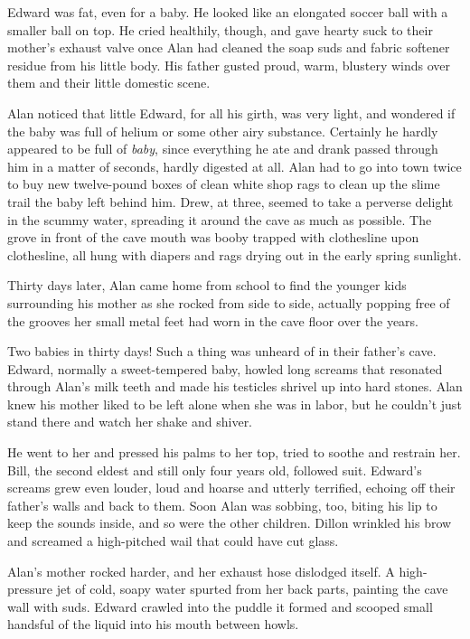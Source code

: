 Edward was fat, even for a baby.  He looked like an elongated soccer
ball with a smaller ball on top.  He cried healthily, though, and gave
hearty suck to their mother's exhaust valve once Alan had cleaned the
soap suds and fabric softener residue from his little body.  His
father gusted proud, warm, blustery winds over them and their little
domestic scene.

Alan noticed that little Edward, for all his girth, was very light,
and wondered if the baby was full of helium or some other airy
substance.  Certainly he hardly appeared to be full of \textit{baby},
since everything he ate and drank passed through him in a matter of
seconds, hardly digested at all.  Alan had to go into town twice to
buy new twelve-pound boxes of clean white shop rags to clean up the
slime trail the baby left behind him.  Drew, at three, seemed to take
a perverse delight in the scummy water, spreading it around the cave
as much as possible.  The grove in front of the cave mouth was booby
trapped with clothesline upon clothesline, all hung with diapers and
rags drying out in the early spring sunlight.

Thirty days later, Alan came home from school to find the younger kids
surrounding his mother as she rocked from side to side, actually
popping free of the grooves her small metal feet had worn in the cave
floor over the years.

Two babies in thirty days!  Such a thing was unheard of in their
father's cave.  Edward, normally a sweet-tempered baby, howled long
screams that resonated through Alan's milk teeth and made his
testicles shrivel up into hard stones.  Alan knew his mother liked to
be left alone when she was in labor, but he couldn't just stand there
and watch her shake and shiver.

He went to her and pressed his palms to her top, tried to soothe and
restrain her.  Bill, the second eldest and still only four years old,
followed suit.  Edward's screams grew even louder, loud and hoarse and
utterly terrified, echoing off their father's walls and back to them. 
Soon Alan was sobbing, too, biting his lip to keep the sounds inside,
and so were the other children.  Dillon wrinkled his brow and screamed
a high-pitched wail that could have cut glass.

Alan's mother rocked harder, and her exhaust hose dislodged itself.  A
high-pressure jet of cold, soapy water spurted from her back parts,
painting the cave wall with suds.  Edward crawled into the puddle it
formed and scooped small handsful of the liquid into his mouth between
howls.


